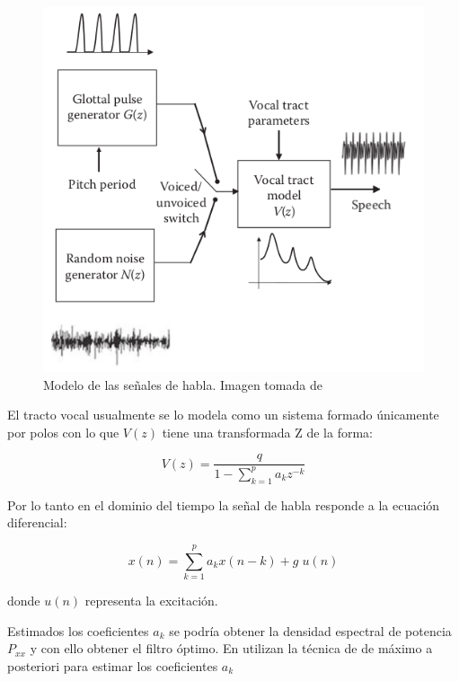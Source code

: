 \begin{figure}
	\centering
	\centerline{\includegraphics[scale=0.5]{images/ch3/voice-modeling.png}}
	\caption{Modelo de las señales de habla. Imagen tomada de \cite{speech_enhancement_theory_and_practice}}
	\label{fig:ch3_voice_modeling}
\end{figure}


El tracto vocal usualmente se lo modela como un sistema formado únicamente por polos \cite{spoken_language_processing} con lo que $V(z)$ tiene una transformada Z de la forma:

\begin{equation*}
	V(z) = \frac{q}{1 - \sum_{k=1}^{p} a_k z^{-k}}
\end{equation*}

Por lo tanto en el dominio del tiempo la señal de habla responde a la ecuación diferencial:

\begin{equation*}
	x(n) = \sum_{k=1}^{p}a_k x(n-k) + g \; u(n)
\end{equation*}

donde $u(n)$ representa la excitación.

Estimados los coeficientes $a_k$ se podría obtener la densidad espectral de potencia $P_{xx}$ y con ello obtener el filtro óptimo. En \cite{all_pole_modeling_of_degraded_speech} utilizan la técnica de de máximo a posteriori para estimar los coeficientes $a_k$

